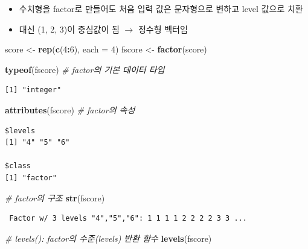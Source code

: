 \documentclass[
  11pt,
]{krantz}
\newenvironment{Shaded}{\begin{snugshade}}{\end{snugshade}}
\newcommand{\CommentTok}[1]{\textcolor[rgb]{0.37,0.37,0.37}{\textit{#1}}}
\newcommand{\DataTypeTok}[1]{\textcolor[rgb]{0.27,0.27,0.27}{#1}}
\newcommand{\DecValTok}[1]{\textcolor[rgb]{0.06,0.06,0.06}{#1}}
\newcommand{\KeywordTok}[1]{\textcolor[rgb]{0.27,0.27,0.27}{\textbf{#1}}}
\newcommand{\NormalTok}[1]{#1}
\newcommand{\OperatorTok}[1]{\textcolor[rgb]{0.43,0.43,0.43}{\textbf{#1}}}
\newcommand{\StringTok}[1]{\textcolor[rgb]{0.5,0.5,0.5}{#1}}
\providecommand{\tightlist}{%
  \setlength{\itemsep}{0pt}\setlength{\parskip}{0pt}}
\begin{document}
\normalsize

\begin{itemize}
\tightlist
\item
  수치형을 factor로 만들어도 처음 입력 값은 문자형으로 변하고 level 값으로 치환
\item
  대신 (1, 2, 3)이 중심값이 됨 \(\rightarrow\) 정수형 벡터임
\end{itemize}

\footnotesize

\begin{Shaded}
\begin{Highlighting}[]
\NormalTok{score <-}\StringTok{ }\KeywordTok{rep}\NormalTok{(}\KeywordTok{c}\NormalTok{(}\DecValTok{4}\OperatorTok{:}\DecValTok{6}\NormalTok{), }\DataTypeTok{each =} \DecValTok{4}\NormalTok{)}
\NormalTok{fscore <-}\StringTok{ }\KeywordTok{factor}\NormalTok{(score)}

\KeywordTok{typeof}\NormalTok{(fscore) }\CommentTok{# factor의 기본 데이터 타입}
\end{Highlighting}
\end{Shaded}

\begin{verbatim}
[1] "integer"
\end{verbatim}

\begin{Shaded}
\begin{Highlighting}[]
\KeywordTok{attributes}\NormalTok{(fscore) }\CommentTok{# factor의 속성}
\end{Highlighting}
\end{Shaded}

\begin{verbatim}
$levels
[1] "4" "5" "6"

$class
[1] "factor"
\end{verbatim}

\begin{Shaded}
\begin{Highlighting}[]
\CommentTok{# factor의 구조}
\KeywordTok{str}\NormalTok{(fscore)}
\end{Highlighting}
\end{Shaded}

\begin{verbatim}
 Factor w/ 3 levels "4","5","6": 1 1 1 1 2 2 2 2 3 3 ...
\end{verbatim}

\begin{Shaded}
\begin{Highlighting}[]
\CommentTok{# levels(): factor의 수준(levels) 반환 함수}
\KeywordTok{levels}\NormalTok{(fscore)}
\end{Highlighting}
\end{Shaded}
\end{document}
